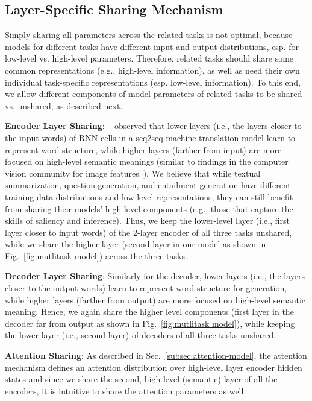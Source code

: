 \documentclass[11pt,a4paper]{article}
\begin{document}
\subsection{Layer-Specific Sharing Mechanism}
\label{subsec:sharing-mechanism}

Simply sharing all parameters across the related tasks is not optimal, because models for different tasks have different input and output distributions, esp. for low-level vs. high-level parameters. Therefore, related tasks should share some common representations (e.g., high-level information), as well as need their own individual task-specific representations (esp. low-level information). To this end, we allow different components of model parameters of related tasks to be shared vs. unshared, as described next. 


\noindent\textbf{Encoder Layer Sharing}:
~ observed that lower layers (i.e., the layers closer to the input words) of RNN cells in a seq2seq machine translation model learn to represent word structure, while higher layers (farther from input) are more focused on high-level semantic meanings (similar to findings in the computer vision community for image features~\cite{zeiler2014visualizing}). We believe that while textual summarization, question generation, and entailment generation have different training data distributions and low-level representations, they can still benefit from sharing their models' high-level components (e.g., those that capture the skills of saliency and inference). Thus, we keep the lower-level layer (i.e., first layer closer to input words) of the 2-layer encoder of all three tasks unshared, while we share the higher layer (second layer in our model as shown in Fig.~\ref{fig:mutlitask model}) across the three tasks. 

\noindent\textbf{Decoder Layer Sharing}:
Similarly for the decoder, lower layers (i.e., the layers closer to the output words) learn to represent word structure for generation, while higher layers (farther from output) are more focused on high-level semantic meaning. Hence, we again share the higher level components (first layer in the decoder far from output as shown in Fig.~\ref{fig:mutlitask model}), while keeping the lower layer (i.e., second layer) of decoders of all three tasks unshared.

\noindent\textbf{Attention Sharing}: As described in Sec.~\ref{subsec:attention-model}, the attention mechanism defines an attention distribution over high-level layer encoder hidden states and since we share the second, high-level (semantic) layer of all the encoders, it is intuitive to share the attention parameters as well. 
\end{document}
